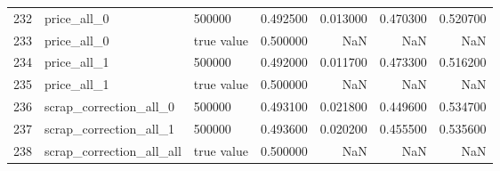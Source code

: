 \begin{tabular}{lllrrrr}
232 & price_all_0 & 500000 & 0.492500 & 0.013000 & 0.470300 & 0.520700 \\
233 & price_all_0 & true value & 0.500000 & NaN & NaN & NaN \\
234 & price_all_1 & 500000 & 0.492000 & 0.011700 & 0.473300 & 0.516200 \\
235 & price_all_1 & true value & 0.500000 & NaN & NaN & NaN \\
236 & scrap_correction_all_0 & 500000 & 0.493100 & 0.021800 & 0.449600 & 0.534700 \\
237 & scrap_correction_all_1 & 500000 & 0.493600 & 0.020200 & 0.455500 & 0.535600 \\
238 & scrap_correction_all_all & true value & 0.500000 & NaN & NaN & NaN \\
\bottomrule
\end{tabular}
